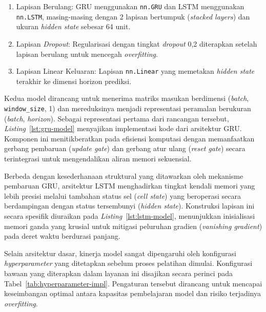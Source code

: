 \begin{enumerate}
    \item Lapisan Berulang: GRU menggunakan \texttt{nn.GRU} dan LSTM menggunakan \texttt{nn.LSTM}, masing-masing dengan 2 lapisan bertumpuk (\textit{stacked layers}) dan ukuran \textit{hidden state} sebesar 64 unit.
    \item Lapisan \textit{Dropout}: Regularisasi dengan tingkat \textit{dropout} 0,2 diterapkan setelah lapisan berulang untuk mencegah \textit{overfitting}.
    \item Lapisan Linear Keluaran: Lapisan \texttt{nn.Linear} yang memetakan \textit{hidden state} terakhir ke dimensi horizon prediksi.
\end{enumerate}

Kedua model dirancang untuk menerima matriks masukan berdimensi (\textit{batch}, \texttt{window\_}\allowbreak\texttt{size}, 1) dan mereduksinya menjadi representasi peramalan berukuran (\textit{batch}, \textit{horizon}). Sebagai representasi pertama dari rancangan tersebut, \textit{Listing}~\ref{lst:gru-model} menyajikan implementasi kode dari arsitektur GRU. Komponen ini menitikberatkan pada efisiensi komputasi dengan memanfaatkan gerbang pembaruan (\textit{update gate}) dan gerbang atur ulang (\textit{reset gate}) secara terintegrasi untuk mengendalikan aliran memori sekuensial.



Berbeda dengan kesederhanaan struktural yang ditawarkan oleh mekanisme pembaruan GRU, arsitektur LSTM menghadirkan tingkat kendali memori yang lebih presisi melalui tambahan status sel (\textit{cell state}) yang beroperasi secara berdampingan dengan status tersembunyi (\textit{hidden state}). Konstruksi lapisan ini secara spesifik diuraikan pada \textit{Listing}~\ref{lst:lstm-model}, menunjukkan inisialisasi memori ganda yang krusial untuk mitigasi peluruhan gradien (\textit{vanishing gradient}) pada deret waktu berdurasi panjang.



Selain arsitektur dasar, kinerja model sangat dipengaruhi oleh konfigurasi \textit{hyperparameter} yang ditetapkan sebelum proses pelatihan dimulai. Konfigurasi bawaan yang diterapkan dalam layanan ini disajikan secara perinci pada Tabel~\ref{tab:hyperparameter-impl}. Pengaturan tersebut dirancang untuk mencapai keseimbangan optimal antara kapasitas pembelajaran model dan risiko terjadinya \textit{overfitting}.

